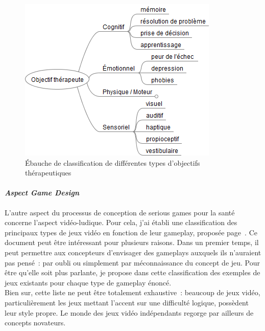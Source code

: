\begin{figure}[hbtp]
	\centering
	\includegraphics[scale=0.7]{images/objectifs_autres}
	\caption{Ébauche de classification de différentes types d'objectifs thérapeutiques}
	\label{objectifs_autres}
\end{figure}

			\paragraph{\emph{Aspect Game Design}\\}
L'autre aspect du processus de conception de serious games pour la santé concerne l'aspect vidéo-ludique. Pour cela, j'ai établi une classification des principaux types de jeux vidéo en fonction de leur gameplay, proposée page~\pageref{types_jeux}. Ce document peut être intéressant pour plusieurs raisons. Dans un premier temps, il peut permettre aux concepteurs d'envisager des gameplays auxquels ils n'auraient pas pensé~: par oubli ou simplement par méconnaissance du concept de jeu. Pour être qu'elle soit plus parlante, je propose dans cette classification des exemples de jeux existants pour chaque type de gameplay énoncé. \\
Bien sur, cette liste ne peut être totalement exhaustive~: beaucoup de jeux vidéo, particulièrement les jeux mettant l'accent sur une difficulté logique, possèdent leur style propre. Le monde des jeux vidéo indépendants regorge par ailleurs de concepts novateurs.

\pagebreak
\makeatletter \label{types_jeux}

\makeatother

